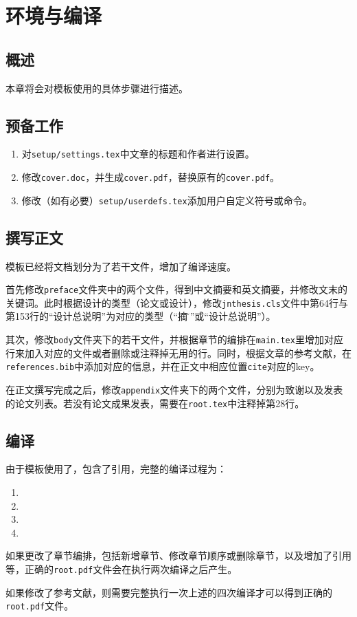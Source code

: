

\chapter{环境与编译}
\label{ch03}

\section{概述}

本章将会对模板使用的具体步骤进行描述。

\section{预备工作}

\begin{enumerate}
    \item 对\texttt{setup/settings.tex}中文章的标题和作者进行设置。
    \item 修改\texttt{cover.doc}，并生成\texttt{cover.pdf}，替换原有的\texttt{cover.pdf}。
    \item 修改（如有必要）\texttt{setup/userdefs.tex}添加用户自定义符号或命令。
\end{enumerate}

\section{撰写正文}

模板已经将文档划分为了若干文件，增加了编译速度。

首先修改\texttt{preface}文件夹中的两个文件，得到中文摘要和英文摘要，并修改文末的关键词。此时根据设计的类型（论文或设计），修改\texttt{jnthesis.cls}文件中第64行与第153行的“设计总说明”为对应的类型（“摘\~要”或“设计总说明”）。

其次，修改\texttt{body}文件夹下的若干文件，并根据章节的编排在\texttt{main.tex}里增加对应行来加入对应的文件或者删除或注释掉无用的行。同时，根据文章的参考文献，在\texttt{references.bib}中添加对应的信息，并在正文中相应位置\texttt{cite}对应的key。

在正文撰写完成之后，修改\texttt{appendix}文件夹下的两个文件，分别为致谢以及发表的论文列表。若没有论文成果发表，需要在\texttt{root.tex}中注释掉第28行。

\section{编译}

由于模板使用了\BibTeX{}，包含了引用，完整的编译过程为：

\begin{enumerate}
    \item \XeLaTeX{}
    \item \XeLaTeX{}
    \item \BibTeX{}
    \item \XeLaTeX{}
\end{enumerate}

如果更改了章节编排，包括新增章节、修改章节顺序或删除章节，以及增加了引用等，正确的\texttt{root.pdf}文件会在执行两次\XeLaTeX{}编译之后产生。

如果修改了参考文献，则需要完整执行一次上述的四次编译才可以得到正确的\texttt{root.pdf}文件。